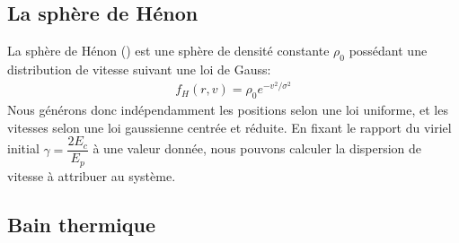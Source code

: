 



		\subsection{La sphère de Hénon}
			\label{Chap::Anal::HénonSec}

			La sphère de Hénon (\cite{1964AnAp...27...83H}) est une sphère de densité
			constante $\rho_0$ possédant une distribution de vitesse suivant
			une loi de Gauss:
			\begin{align}
				f_H(r, v) = \rho_0 e^{-v^2/\sigma^2}
			\end{align}
			Nous générons donc indépendamment les positions selon une loi uniforme, et les vitesses selon
			une loi gaussienne centrée et réduite. En fixant le rapport du viriel initial $\gamma = \dfrac{2E_c}{E_p}$ à une valeur
			donnée, nous pouvons calculer la dispersion de vitesse à attribuer au système.


		\subsection{Bain thermique}


